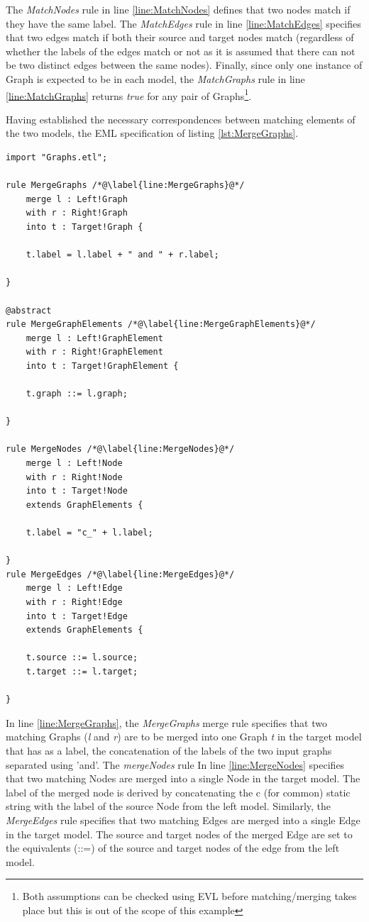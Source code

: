 The \emph{MatchNodes} rule in line \ref{line:MatchNodes} defines that two nodes match if they have the same label. The \emph{MatchEdges} rule in line \ref{line:MatchEdges} specifies that two edges match if both their source and target nodes match (regardless of whether the labels of the edges match or not as it is assumed that there can not be two distinct edges between the same nodes). Finally, since only one instance of Graph is expected to be in each model, the \emph{MatchGraphs} rule in line \ref{line:MatchGraphs} returns \emph{true} for any pair of Graphs\footnote{Both assumptions can be checked using EVL before matching/merging takes place but this is out of the scope of this example}.

Having established the necessary correspondences between matching elements of the two models, the EML specification of listing \ref{lst:MergeGraphs}.

\begin{lstlisting}[label=lst:MergeGraphs, caption=EML module for merging two instances of the Graph metamodel on the correspondences identified in Listing \ref{lst:CompareGraph} , language=EML]
import "Graphs.etl";

rule MergeGraphs /*@\label{line:MergeGraphs}@*/
	merge l : Left!Graph
	with r : Right!Graph
	into t : Target!Graph {
	
	t.label = l.label + " and " + r.label;
	
}

@abstract
rule MergeGraphElements /*@\label{line:MergeGraphElements}@*/
	merge l : Left!GraphElement
	with r : Right!GraphElement
	into t : Target!GraphElement {
	
	t.graph ::= l.graph;
	
}

rule MergeNodes /*@\label{line:MergeNodes}@*/
	merge l : Left!Node
	with r : Right!Node
	into t : Target!Node 
	extends GraphElements {
	
	t.label = "c_" + l.label;
	
}
rule MergeEdges /*@\label{line:MergeEdges}@*/
	merge l : Left!Edge
	with r : Right!Edge
	into t : Target!Edge 
	extends GraphElements {
	
	t.source ::= l.source;
	t.target ::= l.target;
	
}
\end{lstlisting}

In line \ref{line:MergeGraphs}, the \emph{MergeGraphs} merge rule specifies that two matching Graphs (\emph{l} and \emph{r}) are to be merged into one Graph \emph{t} in the target model that has as a label, the concatenation of the labels of the two input graphs separated using 'and'. The \emph{mergeNodes} rule In line \ref{line:MergeNodes} specifies that two matching Nodes are merged into a single Node in the target model. The label of the merged node is derived by concatenating the c (for common) static string with the label of the source Node from the left model. Similarly, the \emph{MergeEdges} rule specifies that two matching Edges are merged into a single Edge in the target model. The source and target nodes of the merged Edge are set to the equivalents (::=) of the source and target nodes of the edge from the left model.

